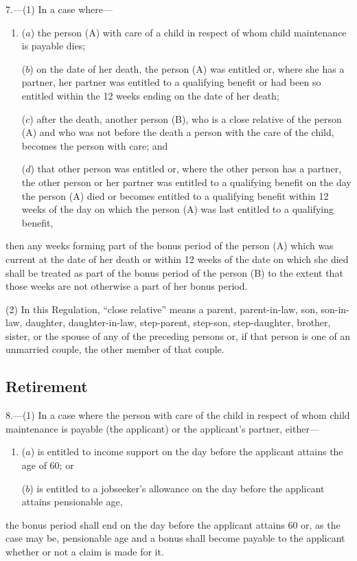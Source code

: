 \documentclass[a4paper]{article}
\begin{document}
7.—(1) In a case where—
\begin{enumerate}\item[]
($a$) the person (A) with care of a child in respect of whom child maintenance is payable dies;

($b$) on the date of her death, the person (A) was entitled or, where she has a partner, her partner was entitled to a qualifying benefit or had been so entitled within the 12 weeks ending on the date of her death;

($c$) after the death, another person (B), who is a close relative of the person (A) and who was not before the death a person with the care of the child, becomes the person with care; and

($d$) that other person was entitled or, where the other person has a partner, the other person or her partner was entitled to a qualifying benefit on the day the person (A) died or becomes entitled to a qualifying benefit within 12 weeks of the day on which the person (A) was last entitled to a qualifying benefit,
\end{enumerate}
then any weeks forming part of the bonus period of the person (A) which was current at the date of her death or within 12 weeks of the date on which she died shall be treated as part of the bonus period of the person (B) to the extent that those weeks are not otherwise a part of her bonus period.

(2) In this Regulation, “close relative” means a parent, parent-in-law, son, son-in-law, daughter, daughter-in-law, step-parent, step-son, step-daughter, brother, sister, or the spouse of any of the preceding persons or, if that person is one of an unmarried couple, the other member of that couple.

\subsection[8. Retirement]{Retirement}

8.—(1) In a case where the person with care of the child in respect of whom child maintenance is payable (the applicant) or the applicant’s partner, either—
\begin{enumerate}\item[]
($a$) is entitled to income support on the day before the applicant attains the age of 60; or

($b$) is entitled to a jobseeker’s allowance on the day before the applicant attains pensionable age,
\end{enumerate}
the bonus period shall end on the day before the applicant attains 60 or, as the case may be, pensionable age and a bonus shall become payable to the applicant whether or not a claim is made for it.
\end{document}
